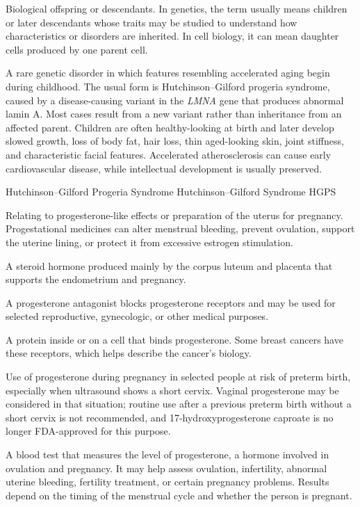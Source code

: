  Biological offspring or descendants. In genetics, the term usually means children or later descendants whose traits may be studied to understand how characteristics or disorders are inherited. In cell biology, it can mean daughter cells produced by one parent cell.

 A rare genetic disorder in which features resembling accelerated aging begin during childhood. The usual form is Hutchinson--Gilford progeria syndrome, caused by a disease-causing variant in the \textit{LMNA} gene that produces abnormal lamin A. Most cases result from a new variant rather than inheritance from an affected parent. Children are often healthy-looking at birth and later develop slowed growth, loss of body fat, hair loss, thin aged-looking skin, joint stiffness, and characteristic facial features. Accelerated atherosclerosis can cause early cardiovascular disease, while intellectual development is usually preserved.

\synonyms
Hutchinson--Gilford Progeria Syndrome
Hutchinson--Gilford Syndrome
HGPS

 Relating to progesterone-like effects or preparation of the uterus for pregnancy. Progestational medicines can alter menstrual bleeding, prevent ovulation, support the uterine lining, or protect it from excessive estrogen stimulation.

 A steroid hormone produced mainly by the corpus luteum and placenta that supports the endometrium and pregnancy.

 A progesterone antagonist blocks progesterone receptors and may be used for selected reproductive, gynecologic, or other medical purposes.

 A protein inside or on a cell that binds progesterone. Some breast cancers have these receptors, which helps describe the cancer's biology.

 Use of progesterone during pregnancy in selected people at risk of preterm birth, especially when ultrasound shows a short cervix. Vaginal progesterone may be considered in that situation; routine use after a previous preterm birth without a short cervix is not recommended, and 17-hydroxyprogesterone caproate is no longer FDA-approved for this purpose.

 A blood test that measures the level of progesterone, a hormone involved in ovulation and pregnancy. It may help assess ovulation, infertility, abnormal uterine bleeding, fertility treatment, or certain pregnancy problems. Results depend on the timing of the menstrual cycle and whether the person is pregnant.

